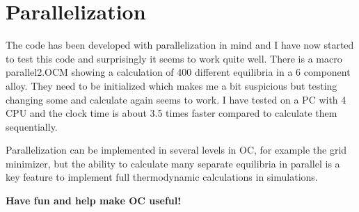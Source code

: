 \documentclass[12pt]{article}
\begin{document}
\section{Parallelization}

The code has been developed with parallelization in mind and I have
now started to test this code and surprisingly it seems to work quite
well.  There is a macro parallel2.OCM showing a calculation of 400
different equilibria in a 6 component alloy.  They need to be
initialized which makes me a bit suspicious but testing changing some
and calculate again seems to work.  I have tested on a PC with 4 CPU
and the clock time is about 3.5 times faster compared to calculate
them sequentially.

Parallelization can be implemented in several levels in OC, for example
the grid minimizer, but the ability to calculate many separate
equilibria in parallel is a key feature to implement full
thermodynamic calculations in simulations.

\bigskip

{\large \bf Have fun and help make OC useful!}
\end{document}
